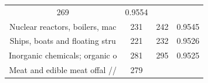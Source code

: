 \documentclass[10pt,]{article}
\begin{document}
\begin{longtable}[]{@{}cccc@{}}
\begin{minipage}[t]{0.20\columnwidth}
269\strut
\end{minipage} & \begin{minipage}[t]{0.09\columnwidth}\centering\strut
0.9554\strut
\end{minipage}\tabularnewline
\begin{minipage}[t]{0.38\columnwidth}\centering\strut
Nuclear reactors, boilers, mac\strut
\end{minipage} & \begin{minipage}[t]{0.21\columnwidth}\centering\strut
231\strut
\end{minipage} & \begin{minipage}[t]{0.20\columnwidth}\centering\strut
242\strut
\end{minipage} & \begin{minipage}[t]{0.09\columnwidth}\centering\strut
0.9545\strut
\end{minipage}\tabularnewline
\begin{minipage}[t]{0.38\columnwidth}\centering\strut
Ships, boats and floating stru\strut
\end{minipage} & \begin{minipage}[t]{0.21\columnwidth}\centering\strut
221\strut
\end{minipage} & \begin{minipage}[t]{0.20\columnwidth}\centering\strut
232\strut
\end{minipage} & \begin{minipage}[t]{0.09\columnwidth}\centering\strut
0.9526\strut
\end{minipage}\tabularnewline
\begin{minipage}[t]{0.38\columnwidth}\centering\strut
Inorganic chemicals; organic o\strut
\end{minipage} & \begin{minipage}[t]{0.21\columnwidth}\centering\strut
281\strut
\end{minipage} & \begin{minipage}[t]{0.20\columnwidth}\centering\strut
295\strut
\end{minipage} & \begin{minipage}[t]{0.09\columnwidth}\centering\strut
0.9525\strut
\end{minipage}\tabularnewline
\begin{minipage}[t]{0.38\columnwidth}\centering\strut
Meat and edible meat offal //\strut
\end{minipage} & \begin{minipage}[t]{0.21\columnwidth}\centering\strut
279\strut
\end{minipage} & \begin{minipage}[t]{0.20\columnwidth}\centering\strut

\end{minipage}
\end{longtable}
\end{document}
